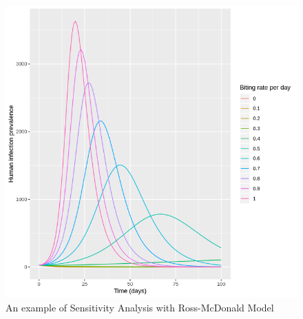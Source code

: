 \documentclass[a4paper, 12pt, twoside]{report}
\begin{document}
\begin{figure}[htpb]
	\centering
	\includegraphics[width=\textwidth]{ross-mcdonald-sensitivity}
	\caption{An example of Sensitivity Analysis with Ross-McDonald Model}
	\label{fig:ross-mcdonald-sensitivity}
\end{figure}
%
%

\newpage
\appendix


\end{document}

